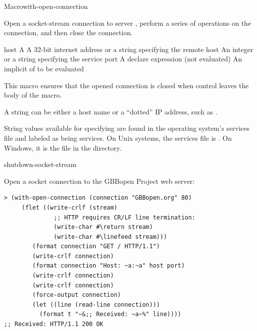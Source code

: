 \documentclass[10pt,twoside,english,pdftex]{article}
\begin{document}

\begin{functiondoc}{Macro}{with-open-connection}%
  {\code{(}\code{)}
    \superstar{}
    \superstar{}}
%
%
%

\fnsyntax

\fnpurpose Open a socket-stream connection to server ,
perform a series of operations on the connection, and then close the
connection.

\fnpackage {}

\fnmodule {}

\fnargs
\begin{args}{host}
\arg[var] A 
\arg[host] A 32-bit internet address or a string specifying the remote host
\arg[port] An integer or a string specifying the service port
\arg[declaration] A declare expression (not evaluated)
\arg[forms] An implicit  of  to be evaluated
\end{args}

\fndescription This macro ensures that the opened connection is closed when
control leaves the body of the macro.

A  string can be either a host name or a ``dotted'' IP address,
such as .

String values available for specifying  are found in the operating
system's services file and labeled as being  services. On Unix
systems, the services file is . On Windows, it is
the file  in the  directory.

\begin{alsos}{shutdown-socket-stream}
\end{alsos}

\fnexample
Open a socket connection to the GBBopen Project web server:
%
\W\supp
\begin{verbatim}
> (with-open-connection (connection "GBBopen.org" 80)
     (flet ((write-crlf (stream)
              ;; HTTP requires CR/LF line termination: 
              (write-char #\return stream)
              (write-char #\linefeed stream)))
        (format connection "GET / HTTP/1.1")
        (write-crlf connection)
        (format connection "Host: ~a:~a" host port)
        (write-crlf connection)
        (write-crlf connection)
        (force-output connection)
        (let ((line (read-line connection)))
          (format t "~&;; Received: ~a~%" line))))
;; Received: HTTP/1.1 200 OK
\end{verbatim}

\end{functiondoc}
\end{document}
